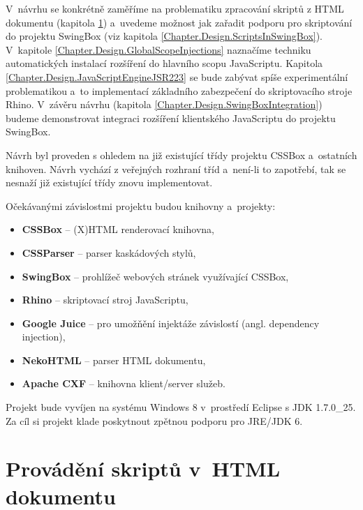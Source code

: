 V~návrhu se konkrétně zaměříme na problematiku zpracování skriptů z HTML dokumentu (kapitola \ref{Chapter.Design.ScriptsInHTML}) a~uvedeme možnost jak zařadit podporu pro skriptování do projektu SwingBox (viz kapitola \ref{Chapter.Design.ScriptsInSwingBox}). V~kapitole \ref{Chapter.Design.GlobalScopeInjections} naznačíme techniku automatických instalací rozšíření do hlavního scopu JavaScriptu. Kapitola \ref{Chapter.Design.JavaScriptEngineJSR223} se bude zabývat spíše experimentální problematikou a~to implementací základního zabezpečení do skriptovacího stroje Rhino. V~závěru návrhu (kapitola \ref{Chapter.Design.SwingBoxIntegration}) budeme demonstrovat integraci rozšíření klientského JavaScriptu do projektu SwingBox.

Návrh byl proveden s ohledem na již existující třídy projektu CSSBox a~ostatních knihoven. Návrh vychází z veřejných rozhraní tříd a~není-li to zapotřebí, tak se nesnaží již existující třídy znovu implementovat. 

\bigskip \noindent Očekávanými závislostmi projektu budou knihovny a~projekty:

\begin{itemize}
  \item \textbf{CSSBox} \cite{Bibliography.CSSBox} -- (X)HTML renderovací knihovna,
  \item \textbf{CSSParser} \cite{Bibliography.jStyleParser} -- parser kaskádových stylů,
  \item \textbf{SwingBox} \cite{Bibliography.SwingBox} -- prohlížeč webových stránek využívající CSSBox,
  \item \textbf{Rhino} \cite{Bibliography.Rhino.Docs} -- skriptovací stroj JavaScriptu,
  \item \textbf{Google Juice} \cite{Bibliography.Google.Juice} -- pro umožňění injektáže závislostí (angl. dependency injection),  
  \item \textbf{NekoHTML} \cite{Bibliography.NekoHTML} -- parser HTML dokumentu,
  \item \textbf{Apache CXF} \cite{Bibliography.Apache.CXF} -- knihovna klient/server služeb.
\end{itemize}

Projekt bude vyvíjen na systému Windows 8 v~prostředí Eclipse s JDK 1.7.0\_25. Za cíl si projekt klade poskytnout zpětnou podporu pro JRE/JDK 6.
 
\section{Provádění skriptů v~HTML dokumentu}
\label{Chapter.Design.ScriptsInHTML}

